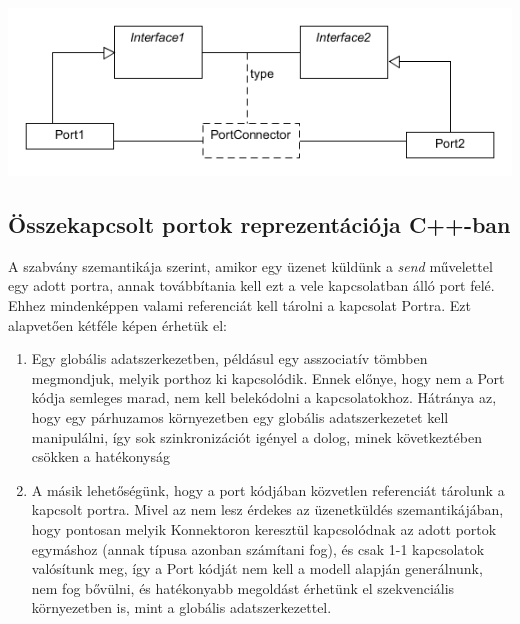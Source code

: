 \documentclass[a4paper,12pt]{report}
\begin{document}
\begin{enumerate}
\includegraphics[scale=0.8]{connect_type.png}
\end{enumerate}

\subsection{Összekapcsolt portok reprezentációja C++-ban} \label{conn_cpp}
A szabvány szemantikája szerint, amikor egy üzenet küldünk a \textit{send} művelettel egy adott portra, annak továbbítania kell ezt a vele kapcsolatban álló port felé. Ehhez mindenképpen valami referenciát kell tárolni a kapcsolat Portra. Ezt alapvetően kétféle képen érhetük el:\\
\begin{enumerate}
\item Egy globális adatszerkezetben, példásul egy asszociatív tömbben megmondjuk, melyik porthoz ki kapcsolódik. Ennek előnye, hogy nem a Port kódja semleges marad, nem kell belekódolni a kapcsolatokhoz.
Hátránya az, hogy egy párhuzamos környezetben egy globális adatszerkezetet kell manipulálni, így sok szinkronizációt igényel a dolog, minek következtében csökken a hatékonyság
\item A másik lehetőségünk, hogy a port kódjában közvetlen referenciát tárolunk a kapcsolt portra. Mivel az nem lesz érdekes az üzenetküldés szemantikájában, hogy pontosan melyik Konnektoron keresztül kapcsolódnak az adott portok egymáshoz (annak típusa azonban számítani fog), és csak 1-1 kapcsolatok valósítunk meg, így a Port kódját nem kell a modell alapján generálnunk, nem fog bővülni, és hatékonyabb megoldást érhetünk el szekvenciális környezetben is, mint a globális adatszerkezettel. 
\end{enumerate}
\end{document}
